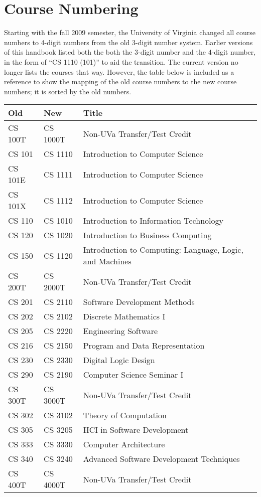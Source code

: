\documentclass[10pt,letter]{book}
\newcommand{\mysection}[1]{\section{#1}\renewcommand{\rightmark}{#1}}
\begin{document}
\mysection{Course Numbering}
\label{course-numbering}

Starting with the fall 2009 semester, the University of Virginia
changed all course numbers to 4-digit numbers from the old 3-digit
number system. Earlier versions of this handbook listed both the both
the 3-digit number and the 4-digit number, in the form of ``CS
1110 (101)'' to aid the transition.  The current version no longer
lists the courses that way.  However, the table below is included as a
reference to show the mapping of the old course numbers to the new
course numbers; it is sorted by the old numbers.

\begin{tabular}{llp{2.5in}} \hline
\bf Old & \bf New & \bf Title \\ \hline
CS 100T & CS 1000T & Non-UVa Transfer/Test Credit \\
CS 101 & CS 1110 & Introduction to Computer Science \\
CS 101E & CS 1111 & Introduction to Computer Science \\
CS 101X & CS 1112 & Introduction to Computer Science \\
CS 110 & CS 1010 & Introduction to Information Technology \\
CS 120 & CS 1020 & Introduction to Business Computing \\
CS 150 & CS 1120 & Introduction to Computing: Language, Logic, and
Machines \\
CS 200T & CS 2000T & Non-UVa Transfer/Test Credit \\
CS 201 & CS 2110 & Software Development Methods \\
CS 202 & CS 2102 & Discrete Mathematics I \\
CS 205 & CS 2220 & Engineering Software \\
CS 216 & CS 2150 & Program and Data Representation \\
CS 230 & CS 2330 & Digital Logic Design \\
CS 290 & CS 2190 & Computer Science Seminar I \\
CS 300T & CS 3000T & Non-UVa Transfer/Test Credit \\
CS 302 & CS 3102 & Theory of Computation \\
CS 305 & CS 3205 & HCI in Software Development \\
CS 333 & CS 3330 & Computer Architecture \\
CS 340 & CS 3240 & Advanced Software Development Techniques \\
CS 400T & CS 4000T & Non-UVa Transfer/Test Credit \\

\end{tabular}
\end{document}
